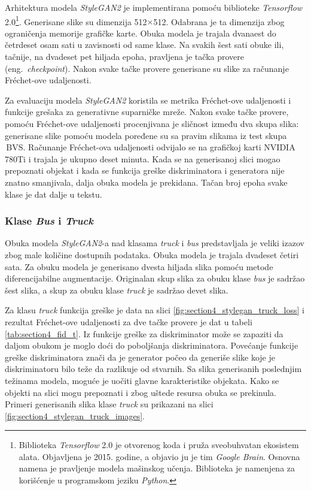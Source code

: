 \documentclass[12pt,oneside]{memoir}
\newcommand{\bvs}{\ensuremath{\,\textrm{BVS}}}
\begin{document}
Arhitektura modela \textit{StyleGAN2} je implementirana pomoću biblioteke \textit{Tensorflow} 2.0\footnote{Biblioteka \textit{Tensorflow} 2.0 je otvorenog koda i pruža sveobuhvatan ekosistem alata. Objavljena je 2015. godine, a objavio ju je tim \textit{Google Brain}. Osnovna namena je pravljenje modela mašinskog učenja. Biblioteka je namenjena za korišćenje u programskom jeziku \textit{Python}.}.
Generisane slike su dimenzija 512\(\times\)512. Odabrana je ta dimenzija zbog ograničenja memorije grafičke karte. Obuka modela je trajala dvanaest do četrdeset osam sati u zavisnosti od same klase. Na svakih šest sati obuke ili, tačnije, na dvadeset pet hiljada epoha, pravljena je tačka provere (eng.~\textit{checkpoint}). Nakon svake tačke provere generisane su slike za računanje Fréchet-ove udaljenosti.


Za evaluaciju modela \textit{StyleGAN2} koristila se metrika Fréchet-ove udaljenosti i funkcije grešaka za generativne suparničke mreže. Nakon svake tačke provere, pomoću Fréchet-ove udaljenosti procenjivana je sličnost između dva skupa slika: generisane slike pomoću modela poređene su sa pravim slikama iz test skupa \bvs. Računanje Fréchet-ova udaljenosti odvijalo se na grafičkoj karti NVIDIA 780Ti i trajala je ukupno deset minuta. Kada se na generisanoj slici mogao prepoznati objekat i kada se funkcija greške diskriminatora i generatora nije znatno smanjivala, dalja obuka modela je prekidana. Tačan broj epoha svake klase je dat dalje u tekstu.


\subsubsection{Klase \textit{Bus} i \textit{Truck}}

Obuka modela \textit{StyleGAN2}-a nad klasama \textit{truck} i \textit{bus} predstavljala je veliki izazov zbog male količine dostupnih podataka. 
Obuka modela je trajala dvadeset četiri sata. Za obuku modela je generisano dvesta hiljada slika pomoću metode diferencijabilne augmentacije. Originalan skup slika za obuku klase \textit{bus} je sadržao šest slika, a skup za obuku klase \textit{truck} je sadržao devet slika.


\clearpage
Za klasu \textit{truck} funkcija greške je data na slici \ref{fig:section4_stylegan_truck_loss} i rezultat Fréchet-ove udaljenosti za dve tačke provere je dat u tabeli \ref{tab:section4_fid_t}. Iz funkcije greške za diskriminator može se zapaziti da daljom obukom je moglo doći do poboljšanja diskriminatora. Povećanje funkcije greške diskriminatora znači da je generator počeo da generiše slike koje je diskriminatoru bilo teže da razlikuje od stvarnih. Sa slika generisanih poslednjim težinama modela, moguće je uočiti glavne karakteristike objekata. Kako se objekti na slici mogu prepoznati i zbog uštede resursa obuka se prekinula. Primeri generisanih slika klase \textit{truck} su prikazani na slici \ref{fig:section4_stylegan_truck_images}.
\end{document}

